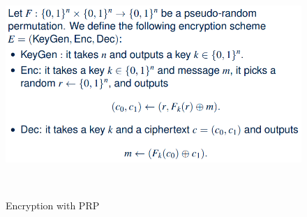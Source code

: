 \documentclass[10pt]{article}
\theoremstyle{plain}
\begin{document}
\begin{figure}
	\begin{description}
		\item [{\includegraphics[scale=0.6]{enc-prp}}]~
	\end{description}
	\caption{Encryption with PRP}
	\label{fig:enc-prp}
\end{figure}
\end{document}
